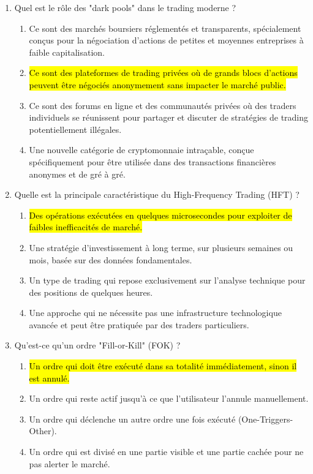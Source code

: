 \documentclass[a4paper,12pt]{article}
\begin{document}
\begin{enumerate}
    \item Quel est le rôle des "dark pools" dans le trading moderne ?
    \begin{enumerate}[label=(\Alph*)]
        \item Ce sont des marchés boursiers réglementés et transparents, spécialement conçus pour la négociation d'actions de petites et moyennes entreprises à faible capitalisation.
        \item \hl{Ce sont des plateformes de trading privées où de grands blocs d'actions peuvent être négociés anonymement sans impacter le marché public.}
        \item Ce sont des forums en ligne et des communautés privées où des traders individuels se réunissent pour partager et discuter de stratégies de trading potentiellement illégales.
        \item Une nouvelle catégorie de cryptomonnaie intraçable, conçue spécifiquement pour être utilisée dans des transactions financières anonymes et de gré à gré.
    \end{enumerate}
    \item Quelle est la principale caractéristique du High-Frequency Trading (HFT) ?
    \begin{enumerate}[label=(\Alph*)]
        \item \hl{Des opérations exécutées en quelques microsecondes pour exploiter de faibles inefficacités de marché.}
        \item Une stratégie d'investissement à long terme, sur plusieurs semaines ou mois, basée sur des données fondamentales.
        \item Un type de trading qui repose exclusivement sur l'analyse technique pour des positions de quelques heures.
        \item Une approche qui ne nécessite pas une infrastructure technologique avancée et peut être pratiquée par des traders particuliers.
    \end{enumerate}

    \item Qu'est-ce qu'un ordre "Fill-or-Kill" (FOK) ?
    \begin{enumerate}[label=(\Alph*)]
        \item \hl{Un ordre qui doit être exécuté dans sa totalité immédiatement, sinon il est annulé.}
        \item Un ordre qui reste actif jusqu'à ce que l'utilisateur l'annule manuellement.
        \item Un ordre qui déclenche un autre ordre une fois exécuté (One-Triggers-Other).
        \item Un ordre qui est divisé en une partie visible et une partie cachée pour ne pas alerter le marché.
    \end{enumerate}


\end{enumerate}
\end{document}
